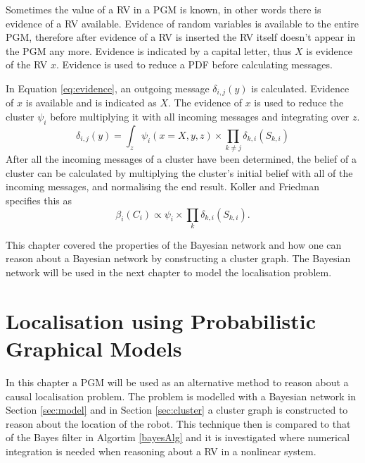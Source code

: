 \documentclass[12pt,oneside,openany,a4paper, %
afrikaans,english,
]{memoir}
\numberwithin{equation}{chapter}
\begin{document}
Sometimes the value of a RV in a PGM is known, in other words there is evidence of a RV available. Evidence of random variables is available to the entire PGM, therefore after evidence of a RV is inserted the RV itself doesn't appear in the PGM any more. Evidence is indicated by a capital letter, thus $X$ is evidence of the RV $x$. Evidence is used to reduce a PDF before calculating messages.

In Equation \ref{eq:evidence}, an outgoing message $\delta_{i , j}(y)$ is calculated. Evidence of $x$ is available and is indicated as $X$. The evidence of $x$ is used to reduce the cluster $\psi_i$ before multiplying it with all incoming messages and integrating over $z$.
\begin{equation}\label{eq:evidence}
\delta_{i , j}(y) = \int_{z}\psi_i(x = X, y, z) \times \prod_{k\ne j} \delta_{k , i}(S_{k,i})
\end{equation}
After all the incoming messages of a cluster have been determined, the belief of a cluster can be calculated by multiplying the cluster's initial belief with all of the incoming messages, and normalising the end result. Koller and Friedman~\cite{koller} specifies this as
\begin{equation}
\beta_i(C_i) \propto \psi_i \times \prod_{k} \delta_{k , i}(S_{k,i}).
\end{equation}

This chapter covered the properties of the Bayesian network and how one can reason about a Bayesian network by constructing a cluster graph. The Bayesian network will be used in the next chapter to model the localisation problem.
\chapter{Localisation using Probabilistic Graphical Models}
In this chapter a PGM will be used as an alternative method to reason about a causal localisation problem. The problem is modelled with a Bayesian network in Section \ref{sec:model} and in Section \ref{sec:cluster} a cluster graph is constructed to reason about the location of the robot. This technique then is compared to that of the Bayes filter in Algortim \ref{bayesAlg} and it is investigated where numerical integration is needed when reasoning about a RV in a nonlinear system.
\end{document}
